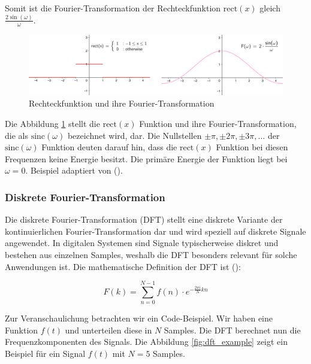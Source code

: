 \documentclass[11pt,a4paper]{article}
\begin{document}
\noindent
\newline
Somit ist die Fourier-Transformation der Rechteckfunktion \( \text{rect}(x) \) gleich
\( \displaystyle\frac{2 \sin(\omega)}{\omega} \).

\begin{figure}[h]
    \centering
    \includegraphics[width=0.8\linewidth]{img/example-fourier-trans.png}
    \caption{Rechteckfunktion und ihre Fourier-Transformation}
    \label{fig:fourier_transform}
\end{figure}

\noindent
Die Abbildung \ref{fig:fourier_transform} stellt die \( \text{rect}(x) \) Funktion und ihre 
Fourier-Transformation, die als \( \text{sinc}(\omega) \) bezeichnet wird, dar. Die Nullstellen 
\( \pm \pi, \pm 2 \pi, \pm 3 \pi, \dots \) der \( \text{sinc}(\omega) \) Funktion deuten darauf 
hin, dass die \( \text{rect}(x) \) Funktion bei diesen Frequenzen keine Energie besitzt. Die 
primäre Energie der Funktion liegt bei \( \omega=0 \). Beispiel adaptiert von 
(\cite[Chapter~5 - Example~5.1]{hansen2014fourier}).



\subsubsection{Diskrete Fourier-Transformation}

Die diskrete Fourier-Transformation (DFT) stellt eine diskrete Variante der kontinuierlichen 
Fourier-Transformation dar und wird speziell auf diskrete Signale angewendet. In digitalen 
Systemen sind Signale typischerweise diskret und bestehen aus einzelnen Samples, weshalb die DFT 
besonders relevant für solche Anwendungen ist. Die mathematische Definition der DFT ist 
(\cite[Chapter~3]{hansen2014fourier}):

\[
F(k) = \sum_{n=0}^{N-1} f(n) \cdot e^{-\frac{2\pi i}{N} kn}
\]

\noindent
\newline
Zur Veranschaulichung betrachten wir ein Code-Beispiel. Wir haben eine Funktion \(f(t)\) und unterteilen
diese in \(N\) Samples. Die DFT berechnet nun die Frequenzkomponenten des Signals. Die Abbildung 
\ref{fig:dft_example} zeigt ein Beispiel für ein Signal \(f(t)\) mit \(N=5\) Samples.
\end{document}
